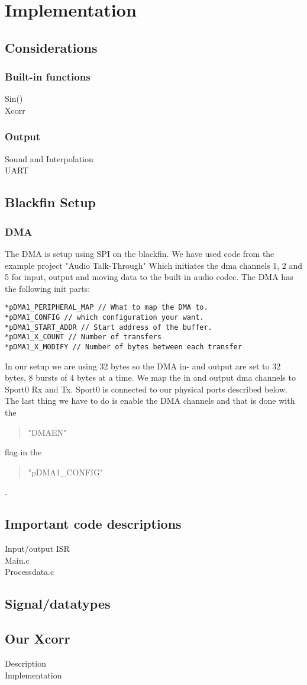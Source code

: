\chapter{Implementation}
\section{Considerations}
\subsection{Built-in functions}
Sin()\\
Xcorr\\
\subsection{Output}
Sound and Interpolation\\
UART\\
\section{Blackfin Setup}
\subsection{DMA}
The DMA is setup using SPI on the blackfin. We have used code from the example project "Audio Talk-Through" Which initiates the dma channels 1, 2 and 5 for input, output and moving data to the built in audio codec. The DMA has the following init parts:
\begin{verbatim}
*pDMA1_PERIPHERAL_MAP // What to map the DMA to.
*pDMA1_CONFIG // which configuration your want.
*pDMA1_START_ADDR // Start address of the buffer.
*pDMA1_X_COUNT // Number of transfers
*pDMA1_X_MODIFY // Number of bytes between each transfer
\end{verbatim}
In our setup we are using 32 bytes so the DMA in- and output are set to 32 bytes, 8 bursts of 4 bytes at a time. We map the in and output dma channels to Sport0 Rx and Tx. Sport0 is connected to our physical ports described below. The last thing we have to do is enable the DMA channels and that is done with the \begin{quote}
"DMAEN"
\end{quote}  flag in the 
\begin{quote}
"pDMA1\_CONFIG"
\end{quote}
.\\
\section{Important code descriptions}
Input/output ISR\\
Main.c\\
Processdata.c\\
\section{Signal/datatypes}
\section{Our Xcorr}
Description\\
Implementation\\